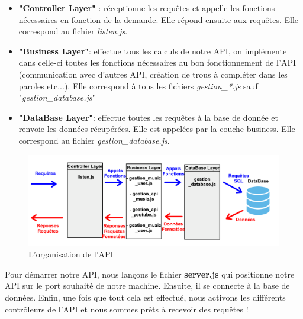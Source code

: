 \documentclass[12pt,french]{article}
\begin{document}
\begin{itemize}
	\item \textbf{"Controller Layer"} : réceptionne les requêtes et appelle les fonctions nécessaires en fonction de la demande. Elle répond ensuite aux requêtes. Elle correspond au fichier \textit{listen.js}.
	\item \textbf{"Business Layer"}: effectue tous les calculs de notre \gls{API}, on implémente dans celle-ci toutes les fonctions nécessaires au bon fonctionnement de l'\gls{API} (communication avec d'autres \gls{API}, création de trous à compléter dans les paroles etc...). Elle correspond à tous les fichiers \textit{gestion\_*.js} sauf "\textit{gestion\_database.js}"
	\item \textbf{"DataBase Layer"}: effectue toutes les requêtes à la base de donnée et renvoie les données récupérées. Elle est appelées par la couche business. Elle correspond au fichier \textit{gestion\_database.js}.
	
\end{itemize}

\bigskip

\begin{figure}[H]
	\centering
	\includegraphics[scale=0.1]{api_couche.png}
	\caption{
	L'organisation de l'API}    
\end{figure}

\bigskip

Pour démarrer notre \gls{API}, nous lançons le fichier \textbf{server.js} qui positionne notre \gls{API} sur le port souhaité de notre machine. Ensuite, il se connecte à la base de données. Enfin, une fois que tout cela est effectué, nous activons les différents contrôleurs de l'\gls{API} et nous sommes prêts à recevoir des requêtes !
\end{document}
